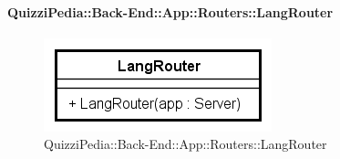 \paragraph{QuizziPedia::Back-End::App::Routers::LangRouter}
\label{QuizziPedia::Back-End::App::Routers::LangRouter}
\begin{figure}[ht]
	\centering
	\includegraphics[scale=0.8]{UML/Classi/Back-End/QuizziPedia_Back-End_App_Routers_LangRouter.png}
	\caption{QuizziPedia::Back-End::App::Routers::LangRouter}
\end{figure}
\FloatBarrier
